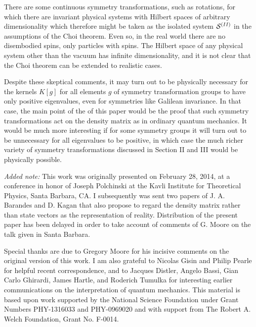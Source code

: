 \documentclass[12pt]{article}
\begin{document}
There are some continuous symmetry transformations, such as rotations, for which there are invariant physical systems with Hilbert spaces of arbitrary dimensionality which  therefore might be taken as the isolated system ${\cal S}^{(II)}$ in the assumptions of the Choi theorem.  Even so, in the real world there are no disembodied spins, only particles with spins.  The Hilbert space of any physical system other than the vacuum has infinite dimensionality, and it is not clear that the Choi theorem can be extended to realistic cases.


Despite these skeptical comments, it may turn out to be physically necessary  for the kernels $K[g]$ for all elements $g$ of   symmetry transformation groups  to have only positive eigenvalues, even for symmetries like Galilean invariance.  In that case, the main point of  the of this paper would be the proof that such  symmetry transformations act on the density matrix as in ordinary quantum mechanics.  It would be much more interesting if for some symmetry groups it will turn out to be unnecessary for all eigenvalues to be positive, in which case the much richer variety of   symmetry transformations
discussed in Section II and III would be physically possible.  

\vspace{20pt}

\noindent
{\em Added note:}  This work was originally presented on February 28, 2014, at a conference in honor of Joseph Polchinski at the Kavli Institute for Theoretical Physics, Santa Barbara, CA.   I subsequently was sent two papers of J. A. Barandes and D. Kagan that also propose to regard the density matrix rather than state vectors as the representation of reality.  Distribution of the present paper has been  delayed in order to take account of comments of G. Moore on the talk given in Santa Barbara. 

\vspace{20pt}


Special thanks are due to Gregory Moore for his incisive comments on the original version of this work.  I am also grateful to Nicolas Gisin and Philip Pearle for helpful recent correspondence, and to Jacques Distler, Angelo Bassi, Gian Carlo Ghirardi, James Hartle, and Roderich Tumulka for interesting earlier communications on the interpretation of quantum mechanics.  This material is based upon work supported by the National Science Foundation under Grant Numbers PHY-1316033 and PHY-0969020 and with support from The Robert A. Welch Foundation, Grant No. F-0014.
\end{document}
